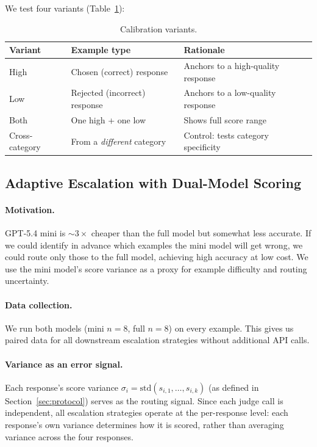 \documentclass{article}
\begin{document}
We test four variants (Table~\ref{tab:cal-variants}):

\begin{table}[ht]
\centering
\caption{Calibration variants.}
\label{tab:cal-variants}
\begin{tabular}{llp{6cm}}
\toprule
Variant & Example type & Rationale \\
\midrule
High  & Chosen (correct) response    & Anchors to a high-quality response \\
Low   & Rejected (incorrect) response & Anchors to a low-quality response \\
Both  & One high + one low           & Shows full score range \\
Cross-category & From a \emph{different} category & Control: tests category specificity \\
\bottomrule
\end{tabular}
\end{table}

\subsection{Adaptive Escalation with Dual-Model Scoring}
\label{sec:escalation}

\paragraph{Motivation.} GPT-5.4 mini is ${\sim}3\times$ cheaper than the full model but somewhat less accurate. If we could identify in advance which examples the mini model will get wrong, we could route only those to the full model, achieving high accuracy at low cost. We use the mini model's score variance as a proxy for example difficulty and routing uncertainty.

\paragraph{Data collection.} We run both models (mini $n{=}8$, full $n{=}8$) on every example. This gives us paired data for all downstream escalation strategies without additional API calls.

\paragraph{Variance as an error signal.} Each response's score variance $\sigma_i = \text{std}(s_{i,1}, \ldots, s_{i,k})$ (as defined in Section~\ref{sec:protocol}) serves as the routing signal. Since each judge call is independent, all escalation strategies operate at the per-response level: each response's own variance determines how it is scored, rather than averaging variance across the four responses.
\end{document}

